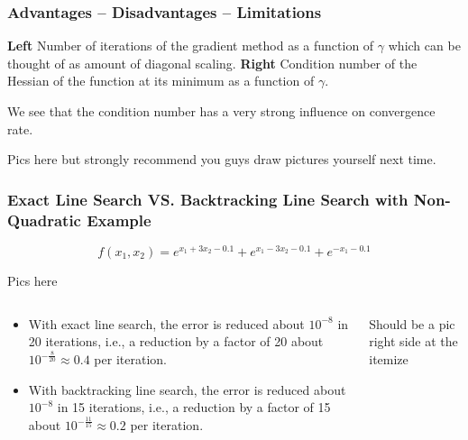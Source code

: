 \begin{frame}
  \frametitle{Advantages -- Disadvantages -- Limitations}
  {\bf Left} Number of iterations of the gradient method as a
    function of $\gamma$ which can be thought of as amount of diagonal
    scaling.
  {\bf Right} Condition number of the Hessian of the function at its
    minimum as a function of $\gamma$.

We see that the condition number has a very strong influence on
convergence rate.

Pics here but strongly recommend you guys draw pictures yourself next
time.
\end{frame}

\begin{frame}
  \frametitle{Exact Line Search VS.  Backtracking Line Search with
    Non-Quadratic Example}
$$f(x_1, x_2) = e^{x_1+3x_2-0.1} + e^{x_1-3x_2-0.1} + e^{-x_1-0.1}$$

Pics here
\begin{columns}
  \begin{column}{0.5\textwidth}
{\footnotesize
    \begin{itemize}
    \item With exact line search, the error is reduced about $10^{-8}$
      in 20 iterations, i.e., a reduction by a factor of
20 about $10^{-\frac{8}{20}} \approx 0.4$ per iteration.
\item With backtracking line search, the error is reduced
about $10^{-8}$ in 15 iterations, i.e., a reduction by a factor of
15 about $10^{-\frac{11}{15}} \approx 0.2$ per iteration.
    \end{itemize}
}
  \end{column}

\begin{column}{0.5\textwidth}
Should be a pic right side at the itemize

\end{column}

\end{columns}
\end{frame}


